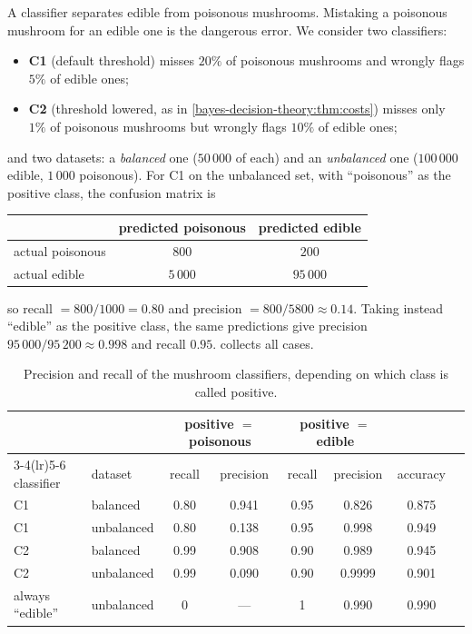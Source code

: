 \begin{notechapter}
A classifier separates edible from poisonous mushrooms. Mistaking a poisonous
mushroom for an edible one is the dangerous error. We consider two classifiers:
\begin{itemize}[nosep]
  \item \textbf{C1} (default threshold) misses $20\%$ of poisonous mushrooms and
        wrongly flags $5\%$ of edible ones;
  \item \textbf{C2} (threshold lowered, as in \cref{bayes-decision-theory:thm:costs})
        misses only $1\%$ of poisonous mushrooms but wrongly flags $10\%$ of
        edible ones;
\end{itemize}
and two datasets: a \emph{balanced} one ($50\,000$ of each) and an
\emph{unbalanced} one ($100\,000$ edible, $1\,000$ poisonous). For C1 on the
unbalanced set, with ``poisonous'' as the positive class, the confusion matrix
is
\begin{center}
\begin{tabular}{@{}l|cc@{}}
 & predicted poisonous & predicted edible \\ \midrule
actual poisonous & $800$ & $200$ \\
actual edible & $5\,000$ & $95\,000$ \\
\end{tabular}
\end{center}
so recall $= 800/1000 = 0.80$ and precision $= 800/5800\approx0.14$. Taking
instead ``edible'' as the positive class, the same predictions give precision
$95\,000/95\,200\approx0.998$ and recall $0.95$.
 collects all cases.

\begin{table}[ht]
\centering
\caption{Precision and recall of the mushroom classifiers, depending on which
class is called positive.}
\label{measuring-performance:tab:mushrooms}
\begin{tabular}{@{}llcccccc@{}}
\toprule
 & & \multicolumn{2}{c}{positive $=$ poisonous} & \multicolumn{2}{c}{positive $=$ edible} & \\
\cmidrule(lr){3-4}\cmidrule(lr){5-6}
classifier & dataset & recall & precision & recall & precision & accuracy \\
\midrule
C1 & balanced   & 0.80 & 0.941 & 0.95 & 0.826 & 0.875 \\
C1 & unbalanced & 0.80 & 0.138 & 0.95 & 0.998 & 0.949 \\
C2 & balanced   & 0.99 & 0.908 & 0.90 & 0.989 & 0.945 \\
C2 & unbalanced & 0.99 & 0.090 & 0.90 & 0.9999 & 0.901 \\
\midrule
always ``edible'' & unbalanced & 0 & --- & 1 & 0.990 & 0.990 \\
\bottomrule
\end{tabular}
\end{table}


\end{notechapter}
